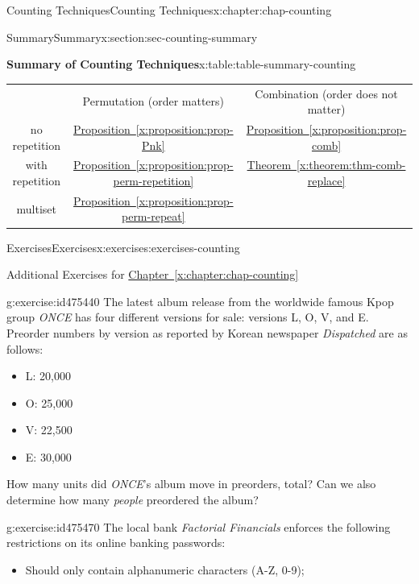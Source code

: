 \documentclass[oneside,10pt,]{book}
\newcommand{\xreffont}{\relax}
\numberwithin{equation}{section}
\newcommand{\hrulemedium}{\noalign{\hrule height 0.07em}}
\begin{document}
\begin{chapterptx}{Counting Techniques}{}{Counting Techniques}{}{}{x:chapter:chap-counting}
\begin{sectionptx}{Summary}{}{Summary}{}{}{x:section:sec-counting-summary}
\begin{tableptx}{\textbf{Summary of Counting Techniques}}{x:table:table-summary-counting}{}
{\begin{tabular}{ccc}
&Permutation (order matters)&Combination (order does not matter)\tabularnewline\hrulemedium
no repetition&\hyperref[x:proposition:prop-Pnk]{Proposition~{\xreffont\ref{x:proposition:prop-Pnk}}}&\hyperref[x:proposition:prop-comb]{Proposition~{\xreffont\ref{x:proposition:prop-comb}}}\tabularnewline[0pt]
with repetition&\hyperref[x:proposition:prop-perm-repetition]{Proposition~{\xreffont\ref{x:proposition:prop-perm-repetition}}}&\hyperref[x:theorem:thm-comb-replace]{Theorem~{\xreffont\ref{x:theorem:thm-comb-replace}}}\tabularnewline[0pt]
multiset&\hyperref[x:proposition:prop-perm-repeat]{Proposition~{\xreffont\ref{x:proposition:prop-perm-repeat}}}&\textendash{} \textendash{} \textendash{} \textendash{} \textendash{}
\end{tabular}
}%
\end{tableptx}%
\end{sectionptx}
%
%
\typeout{************************************************}
\typeout{************************************************}
%
\begin{exercises-section}{Exercises}{}{Exercises}{}{}{x:exercises:exercises-counting}
\begin{introduction}{}%
Additional Exercises for \hyperref[x:chapter:chap-counting]{Chapter~{\xreffont\ref{x:chapter:chap-counting}}}%
\end{introduction}%
\begin{divisionexercise}{1}{}{}{g:exercise:id475440}%
The latest album release from the worldwide famous Kpop group \emph{ONCE} has four different versions for sale: versions L, O, V, and E. Preorder numbers by version as reported by Korean newspaper \emph{Dispatched} are as follows:%
\begin{itemize}[label=\textbullet]
\item{}L: 20,000%
\item{}O: 25,000%
\item{}V: 22,500%
\item{}E: 30,000%
\end{itemize}
How many units did \emph{ONCE}'s album move in preorders, total? Can we also determine how many \emph{people} preordered the album?%
\end{divisionexercise}%
\begin{divisionexercise}{2}{}{}{g:exercise:id475470}%
The local bank \emph{Factorial Financials} enforces the following restrictions on its online banking passwords:%
\begin{itemize}[label=\textbullet]
\item{}Should only contain alphanumeric characters (A-Z, 0-9);%

\end{itemize}
\end{divisionexercise}
\end{exercises-section}
\end{chapterptx}
\end{document}
